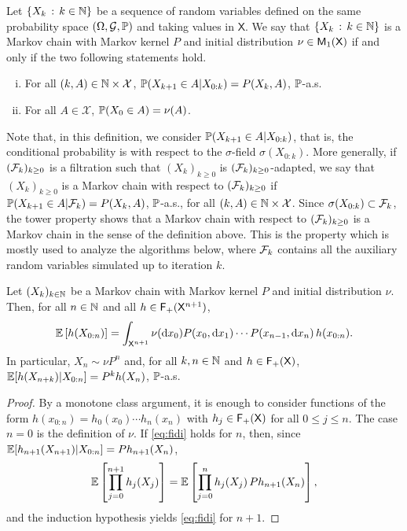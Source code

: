 \documentclass[english,graybox,envcountchap,envcountsame,sectrefs,shortlabels]{svmono}
\theoremstyle{style}
\newcommand{\eqsp}{}
\newcommand{\Xset}{\mathsf{X}}
\newcommand{\Xsigma}{\mathcal{X}}
\begin{document}
\begin{definition}
Let $\left\{ X_{k}\,:\,k\in\mathbb{N}\right\}$
be a sequence of random variables defined on the same probability space $(\Omega,\mathcal{G},\mathbb{P})$
and taking values in $\Xset$. We say that $\left\{ X_{k}\,:\,k\in\mathbb{N}\right\}$
is a Markov chain with Markov kernel $P$ and initial distribution
$\nu\in\meas 1(\Xset)$ if and only if the two following statements hold.
\begin{enumerate}[i)]
\item  For all $(k,A)\in\nset\times\Xsigma$,  $\mathbb{P}(X_{k+1}\in A|X_{0:k})=P(X_{k},A)$,
$\mathbb{P}$-a.s.
\item For all $A\in\Xsigma$, $\mathbb{P}(X_{0}\in A)=\nu(A)$.
\end{enumerate}
\end{definition}
Note that, in this definition, we consider $\mathbb{P}(X_{k+1}\in A|X_{0:k})$,
that is, the conditional probability is with respect to the $\sigma$-field
$\sigma(X_{0:k})$. More generally, if $(\mathcal{F}_{k})_{k\geq0}$ is a filtration such that $(X_{k})_{k\geq0}$ is $(\mathcal{F}_{k})_{k\geq0}$-adapted, we say that $(X_k)_{k\geq 0}$ is a Markov chain with respect to $(\mathcal{F}_{k})_{k\geq0}$ if $\mathbb{P}(X_{k+1}\in A|\mathcal{F}_{k})=P(X_{k},A)$, $\mathbb{P}$-a.s., for all $(k,A)\in\nset\times\Xsigma$. Since $\sigma(X_{0:k})\subset\mathcal{F}_k$, the tower property shows that a Markov chain with respect to $(\mathcal{F}_{k})_{k\geq0}$ is a Markov chain in the sense of the definition above. This is the property which is mostly used to analyze the algorithms below, where $\mathcal{F}_k$ contains all the auxiliary random variables simulated up to iteration $k$.

\begin{proposition}
\label{prop:fidi}
Let $(X_k)_{k\in\mathbb{N}}$ be a Markov chain with Markov kernel $P$ and initial distribution $\nu$. Then, for all $n\in\mathbb{N}$ and all $h\in\funcset{+}(\Xset^{n+1})$,
\begin{equation}
\label{eq:fidi}
\PE\lrb{h(X_{0:n})} = \int_{\Xset^{n+1}} \nu(\rmd x_0)P(x_0,\rmd x_1)\cdots P(x_{n-1},\rmd x_n)\, h(x_{0:n})\eqsp.
\end{equation}
In particular, $X_n\sim\nu P^n$ and, for all $k,n\in\mathbb{N}$ and $h\in\funcset{+}(\Xset)$, $\mathbb{E}[h(X_{n+k})|X_{0:n}] = P^k h(X_n)$, $\mathbb{P}$-a.s.
\end{proposition}
\begin{proof}
By a monotone class argument, it is enough to consider functions of the form $h(x_{0:n}) = h_0(x_0)\cdots h_n(x_n)$ with $h_j\in\funcset{+}(\Xset)$ for all $0\leq j \leq n$. The case $n=0$ is the definition of $\nu$. If \eqref{eq:fidi} holds for $n$, then, since $\mathbb{E}[h_{n+1}(X_{n+1})|X_{0:n}] = Ph_{n+1}(X_n)$,
$$
\PE\left[\prod_{j=0}^{n+1}h_j(X_j)\right] = \PE\left[\prod_{j=0}^{n}h_j(X_j)\, Ph_{n+1}(X_n)\right]\eqsp,
$$
and the induction hypothesis yields \eqref{eq:fidi} for $n+1$. 
\end{proof}
\end{document}
